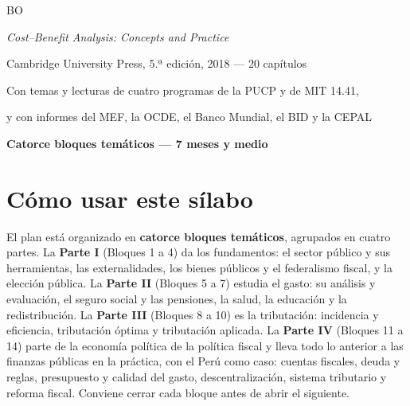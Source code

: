 \documentclass[11pt,a4paper]{article}
\newcommand{\etiqueta}[2]{%
  {\setlength{\fboxsep}{1.4pt}\colorbox{#1}{\sffamily\bfseries\color{white}\strut#2}}}
\begin{document}
\begin{titlepage}
{\large\etiqueta{colorBO}{BO} \par}
{\normalsize \emph{\color{colorBO}Cost--Benefit Analysis: Concepts and Practice}\par}
{\small\color{tonoPizarra} Cambridge University Press, 5.ª edición, 2018 --- 20 capítulos\par}
\vspace{0.4cm}
{\normalsize\color{colorPUCP} Con temas y lecturas de cuatro programas de la PUCP y de MIT 14.41,\par}
{\normalsize\color{colorPUCP} y con informes del MEF, la OCDE, el Banco Mundial, el BID y la CEPAL\par}
\vfill
{\setlength{\fboxsep}{6pt}\colorbox{tonoPrincipal}{\normalsize\sffamily\bfseries\color{white} Catorce bloques temáticos --- 7 meses y medio}\par}
\vspace{0.1cm}
\end{titlepage}

\tableofcontents
\newpage

\section*{Cómo usar este sílabo}

El plan está organizado en \textbf{catorce bloques temáticos}, agrupados en
cuatro partes. La \textbf{Parte I} (Bloques 1 a 4) da los fundamentos: el
sector público y sus herramientas, las externalidades, los bienes públicos y
el federalismo fiscal, y la elección pública. La \textbf{Parte II} (Bloques 5
a 7) estudia el gasto: su análisis y evaluación, el seguro social y las
pensiones, la salud, la educación y la redistribución. La \textbf{Parte III}
(Bloques 8 a 10) es la tributación: incidencia y eficiencia, tributación
óptima y tributación aplicada. La \textbf{Parte IV} (Bloques 11 a 14) parte de
la economía política de la política fiscal y lleva todo lo anterior a las
finanzas públicas en la práctica, con el Perú como caso: cuentas fiscales, deuda y reglas, presupuesto y calidad del gasto,
descentralización, sistema tributario y reforma fiscal. Conviene cerrar cada
bloque antes de abrir el siguiente.
\end{document}
